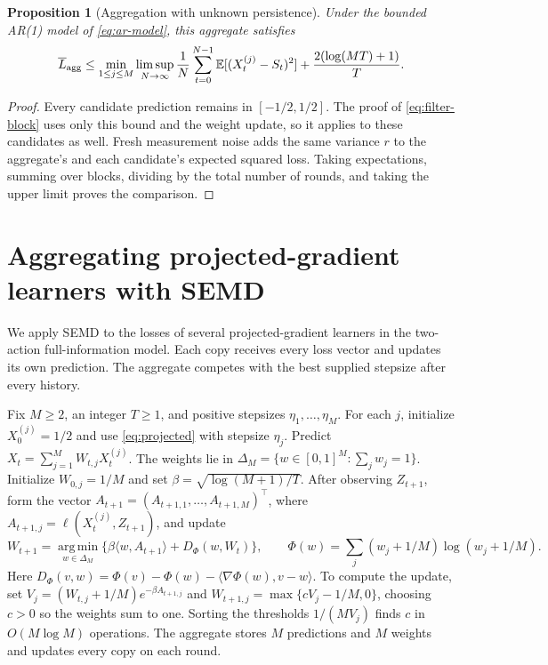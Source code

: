 \documentclass[11pt,twoside]{article}
\newcommand{\E}{\mathbb E}
\newtheorem{proposition}[theorem]{Proposition}
\theoremstyle{definition}
\theoremstyle{remark}
\begin{document}
\begin{proposition}[Aggregation with unknown persistence]
Under the bounded AR(1) model of \cref{eq:ar-model}, this aggregate satisfies
\[
 \overline L_{\rm agg}
 \le \min_{1\le j\le M}\limsup_{N\to\infty}
       \frac1N\sum_{t=0}^{N-1}\E[(X_t^{(j)}-S_t)^2]
       +\frac{2(\log(MT)+1)}T.
\]
\end{proposition}
\begin{proof}
Every candidate prediction remains in $[-1/2,1/2]$. The proof of
\cref{eq:filter-block} uses only this bound and the weight update, so it
applies to these candidates as well. Fresh measurement noise adds the
same variance $r$ to the aggregate's and each candidate's expected squared
loss. Taking expectations, summing over blocks, dividing by the total
number of rounds, and taking the upper limit proves the comparison.
\end{proof}

\section{Aggregating projected-gradient learners with SEMD}
\label{app:stepsize-aggregation}

We apply SEMD to the losses of several projected-gradient learners in the
two-action full-information model. Each copy receives every loss vector
and updates its own prediction. The aggregate competes with the best
supplied stepsize after every history.

Fix $M\ge2$, an integer $T\ge1$, and positive stepsizes
$\eta_1,\ldots,\eta_M$. For each $j$, initialize $X_0^{(j)}=1/2$ and
use \cref{eq:projected} with stepsize $\eta_j$. Predict
$X_t=\sum_{j=1}^M W_{t,j}X_t^{(j)}$. The weights lie in
$\Delta_M=\{w\in[0,1]^M:\sum_jw_j=1\}$. Initialize $W_{0,j}=1/M$ and set
$\beta=\sqrt{\log(M+1)/T}$. After observing $Z_{t+1}$, form the vector
$A_{t+1}=(A_{t+1,1},\ldots,A_{t+1,M})^\top$, where
$A_{t+1,j}=\ell(X_t^{(j)},Z_{t+1})$, and update
\[
 W_{t+1}=\operatorname*{arg\,min}_{w\in\Delta_M}
 \{\beta\langle w,A_{t+1}\rangle+D_\Phi(w,W_t)\},\qquad
 \Phi(w)=\sum_j(w_j+1/M)\log(w_j+1/M).
\]
Here $D_\Phi(v,w)=\Phi(v)-\Phi(w)-\langle\nabla\Phi(w),v-w\rangle$.
To compute the update, set $V_j=(W_{t,j}+1/M)e^{-\beta A_{t+1,j}}$
and $W_{t+1,j}=\max\{cV_j-1/M,0\}$, choosing $c>0$ so the weights
sum to one. Sorting the thresholds $1/(MV_j)$ finds $c$ in
$O(M\log M)$ operations. The aggregate stores $M$ predictions and
$M$ weights and updates every copy on each round.
\end{document}
